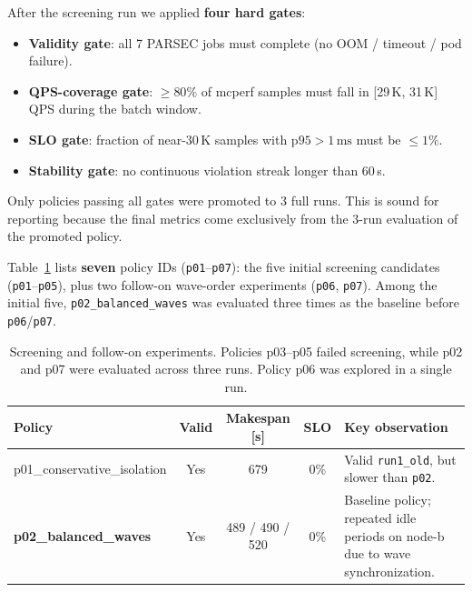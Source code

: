 \begin{enumerate}
\begin{enumerate}
After the screening run we applied \textbf{four hard gates}:
\begin{itemize}
  \item \textbf{Validity gate}: all 7 PARSEC jobs must complete
    (no OOM / timeout / pod failure).

  \item \textbf{QPS-coverage gate}: $\geq 80\%$ of mcperf samples must fall
    in [29\,K, 31\,K]\,QPS during the batch window.

  \item \textbf{SLO gate}: fraction of near-30\,K samples with
    $\mathrm{p95} > 1\,\mathrm{ms}$ must be $\leq 1\%$.

  \item \textbf{Stability gate}: no continuous violation streak longer than
    60\,s.
\end{itemize}

Only policies passing all gates were promoted to 3 full runs.
This is sound for reporting because the final metrics come exclusively from the
3-run evaluation of the promoted policy.

Table~\ref{tab:screening} lists \textbf{seven} policy IDs (\texttt{p01}--\texttt{p07}):
the five initial screening candidates (\texttt{p01}--\texttt{p05}), plus two
follow-on wave-order experiments (\texttt{p06}, \texttt{p07}).  Among the
initial five, \texttt{p02\_balanced\_waves} was evaluated three times as the
baseline before \texttt{p06}/\texttt{p07}.

\begin{table}[htbp]
\centering
\small
\setlength{\tabcolsep}{6pt}
\renewcommand{\arraystretch}{1.15}

\caption{Screening and follow-on experiments. Policies p03--p05 failed
screening, while p02 and p07 were evaluated across three runs. Policy p06
was explored in a single run.}
\label{tab:screening}

\begin{tabular}{lccc p{5.2cm}}
\toprule
\textbf{Policy} & \textbf{Valid} & \textbf{Makespan [s]} &
\textbf{SLO} & \textbf{Key observation} \\
\midrule

p01\_conservative\_isolation
& Yes & 679 & 0\%
& Valid \texttt{run1\_old}, but slower than \texttt{p02}. \\

\textbf{p02\_balanced\_waves}
& Yes & 489 / 490 / 520 & 0\%
& Baseline policy; repeated idle periods on node-b due to wave synchronization. \\


\end{tabular}
\end{table}
\end{enumerate}
\end{enumerate}
